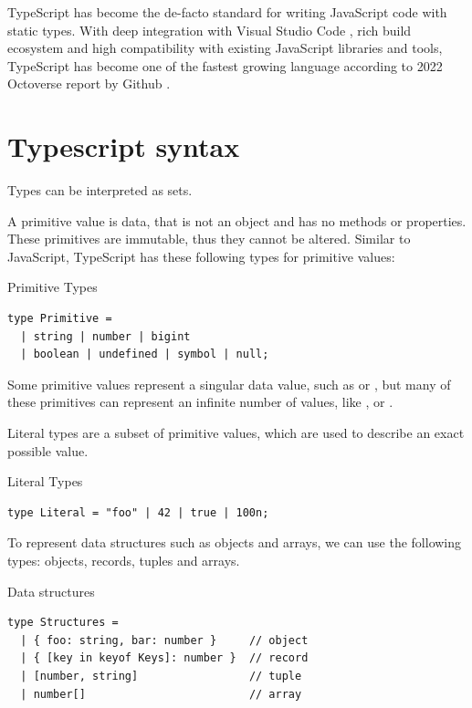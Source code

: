 TypeScript has become the de-facto standard for writing JavaScript code with static types. With deep integration with Visual Studio Code \cite{VisualStudioCode}, rich build ecosystem and high compatibility with existing JavaScript libraries and tools, TypeScript has become one of the fastest growing language according to 2022 Octoverse report by Github \cite{Octoverse2022State}.

\section{Typescript syntax}

Types can be interpreted as sets.

A primitive value is data, that is not an object and has no methods or properties. These primitives are immutable, thus they cannot be altered. Similar to JavaScript, TypeScript has these following types for primitive values:

\begin{listing}[h]
\caption{Primitive Types}
\begin{verbatim}
type Primitive = 
  | string | number | bigint
  | boolean | undefined | symbol | null;
\end{verbatim}
\end{listing}


Some primitive values represent a singular data value, such as  or , but many of these primitives can represent an infinite number of values, like ,  or .

Literal types are a subset of primitive values, which are used to describe an exact possible value.

\begin{listing}[h]
\caption{Literal Types}
\begin{verbatim}
type Literal = "foo" | 42 | true | 100n;
\end{verbatim}
\end{listing}

To represent data structures such as objects and arrays, we can use the following types: objects, records, tuples and arrays.

\begin{listing}[h]
\caption{Data structures}
\begin{verbatim}
type Structures = 
  | { foo: string, bar: number }     // object
  | { [key in keyof Keys]: number }  // record
  | [number, string]                 // tuple
  | number[]                         // array
\end{verbatim}
\end{listing}


